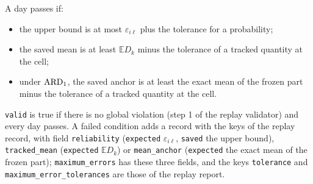 A day passes if:
\begin{itemize}[nosep]
  \item the upper bound is at most $\varepsilon_{i\ell}$ plus the tolerance for a probability;
  \item the saved mean is at least $\mathbb{E}D_k$ minus the tolerance of a tracked quantity at the cell;
  \item under $\mathrm{ARD}_{1}$, the saved anchor is at least the exact mean of the frozen part minus the tolerance of a tracked quantity at the cell.
\end{itemize}
\texttt{valid} is true if there is no global violation (step 1 of the replay validator) and every day passes. A failed condition adds a record with the keys of the replay record, with field \texttt{reliability} (\texttt{expected} $\varepsilon_{i\ell}$, \texttt{saved} the upper bound), \texttt{tracked\_mean} (\texttt{expected} $\mathbb{E}D_k$) or \texttt{mean\_anchor} (\texttt{expected} the exact mean of the frozen part); \texttt{maximum\_errors} has these three fields, and the keys \texttt{tolerance} and \texttt{maximum\_error\_tolerances} are those of the replay report.

\tabend

